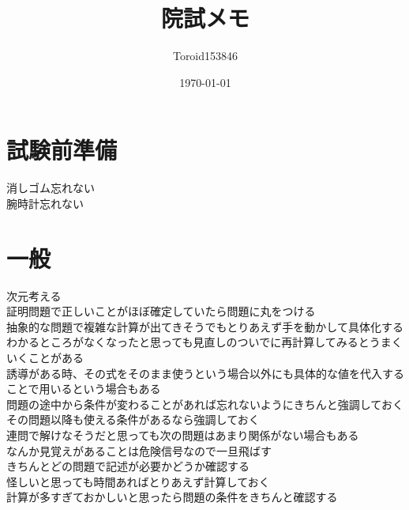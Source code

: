 \documentclass{ltjsarticle}
\title{院試メモ}
\author{Toroid153846}
\date{\today}
\begin{document}
\maketitle
  \section{試験前準備}
  消しゴム忘れない\\
  腕時計忘れない
  \section{一般}
  次元考える\\
  証明問題で正しいことがほぼ確定していたら問題に丸をつける\\
  抽象的な問題で複雑な計算が出てきそうでもとりあえず手を動かして具体化する\\
  わかるところがなくなったと思っても見直しのついでに再計算してみるとうまくいくことがある\\
  誘導がある時、その式をそのまま使うという場合以外にも具体的な値を代入することで用いるという場合もある\\
  問題の途中から条件が変わることがあれば忘れないようにきちんと強調しておく\\
  その問題以降も使える条件があるなら強調しておく\\
  連問で解けなそうだと思っても次の問題はあまり関係がない場合もある\\
  なんか見覚えがあることは危険信号なので一旦飛ばす\\
  きちんとどの問題で記述が必要かどうか確認する\\
  怪しいと思っても時間あればとりあえず計算しておく\\
  計算が多すぎておかしいと思ったら問題の条件をきちんと確認する\\
\end{document}
